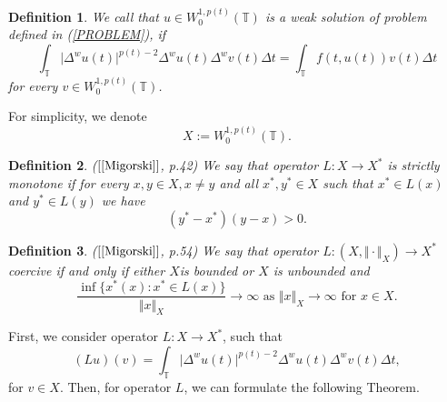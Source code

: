 \documentclass[12pt,a4paper,oneside,titlepage]{article}
\newtheorem{Def}{Definition}
\begin{document}
\begin{Def} We call that $u \in W^{1,p(t)}_{0} (\mathbb{T}) $ is a weak solution of problem defined in (\ref{PROBLEM}), if 
\begin{equation}
\nonumber
\int_{\mathbb{T}} \vert \Delta^{w} u(t) \vert^{p(t)-2} \Delta^{w}u (t) \Delta^{w}v(t) \Delta t = \int_{\mathbb{T}}f(t,u(t)) v(t) \Delta t
\end{equation}
for every $v \in W^{1,p(t)}_{0} (\mathbb{T}) $.
\end{Def}
For simplicity, we denote
\begin{equation}
\nonumber
X:=W^{1,p(t)}_{0}(\mathbb{T}).
\end{equation}
\begin{Def} ($[\ref{Migorski}]$, p.42) We say that operator $L: X \rightarrow X^{*}$ is strictly monotone if for every $x,y \in X, x \neq y$ and all $x^{*}, y^{*} \in X$ such that $x^* \in L(x)$ and $y^* \in L(y)$ we have
\begin{equation}
\nonumber
(y^{*}-x^{*})(y-x) >0.
\end{equation}
\end{Def}
\begin{Def} ($[\ref{Migorski}]$, p.54) We say that operator $L: (X,\Vert \cdot \Vert_{X} ) \rightarrow X^{*}$ coercive if and only if either $X $is bounded
or $X$ is unbounded and
\begin{equation}
\nonumber
\frac{\inf \lbrace x^{*}(x) : x^{*} \in L(x) \rbrace}{\Vert x \Vert_{X}} \rightarrow \infty \text{ as } \Vert x \Vert_{X} \rightarrow \infty \text{ for } x \in X.
\end{equation}
\end{Def}
\bigskip
First, we consider operator $L:X \rightarrow X^{*}$, such that
\begin{equation}
\label{operatorL}
(Lu)(v)=\int_{\mathbb{T}} \vert \Delta^{w}u(t) \vert^{p(t)-2} \Delta^{w}u(t) \Delta^{w}v(t) \Delta t,
\end{equation}
for $v \in X.$
Then, for operator $L$, we can formulate the following Theorem.
\end{document}
